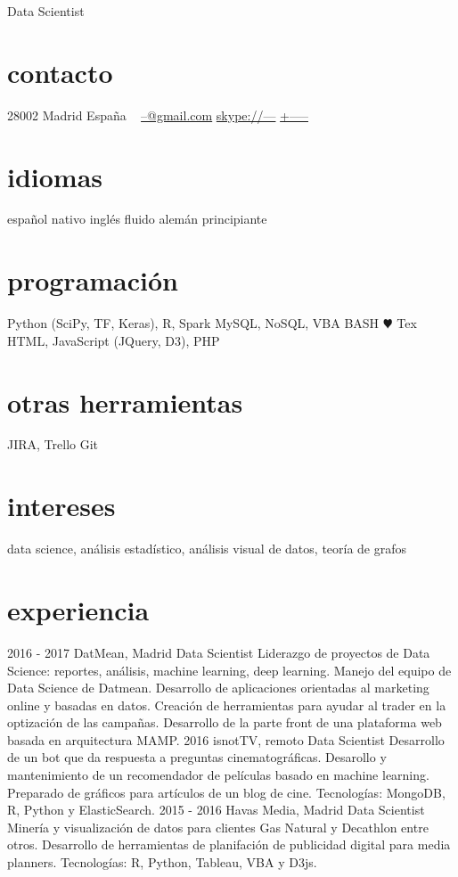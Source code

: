 \documentclass[]{friggeri-cv}
\begin{document}
\else

       {Data Scientist}


\begin{aside}
  \section{contacto}
    28002 Madrid
    España
    ~
    \href{mailto:--@gmail.com}{--@gmail.com}
    \href{skype:<--->[add]}{skype://---}
    \href{tel:----}{+-----}
  \section{idiomas}
    español nativo
    inglés fluido
    alemán principiante
  \section{programación}
    Python (SciPy, TF, Keras), R, Spark
    MySQL, NoSQL, VBA
    BASH
    {\color{red} $\varheartsuit$} Tex
    HTML, JavaScript (JQuery, D3), PHP
  \section{otras herramientas}
    JIRA, Trello
    Git
\end{aside}

\section{intereses}

data science, análisis estadístico, análisis visual de datos, teoría de grafos

\section{experiencia}

\begin{entrylist}
    \entry
    {2016 - 2017}
    {DatMean, Madrid}
    {Data Scientist}
    {Liderazgo de proyectos de Data Science: reportes, análisis, machine learning, deep learning. Manejo del equipo de Data Science de Datmean. Desarrollo de aplicaciones orientadas al marketing online y basadas en datos. Creación de herramientas para ayudar al trader en la optización de las campañas. Desarrollo de la parte front de una plataforma web basada en arquitectura MAMP.}
  \entry
    {2016}
    {isnotTV, remoto}
    {Data Scientist}
    {Desarrollo de un bot que da respuesta a preguntas cinematográficas. Desarollo y mantenimiento de un recomendador de películas basado en machine learning. Preparado de gráficos para artículos de un blog de cine. Tecnologías: MongoDB, R, Python y ElasticSearch.}
  \entry
    {2015 - 2016}
    {Havas Media, Madrid}
    {Data Scientist}
    {Minería y visualización de datos para clientes Gas Natural y Decathlon entre otros. Desarrollo de herramientas de planifación de publicidad digital para media planners. Tecnologías: R, Python, Tableau, VBA y D3js.}
\end{entrylist}
\end{document}
